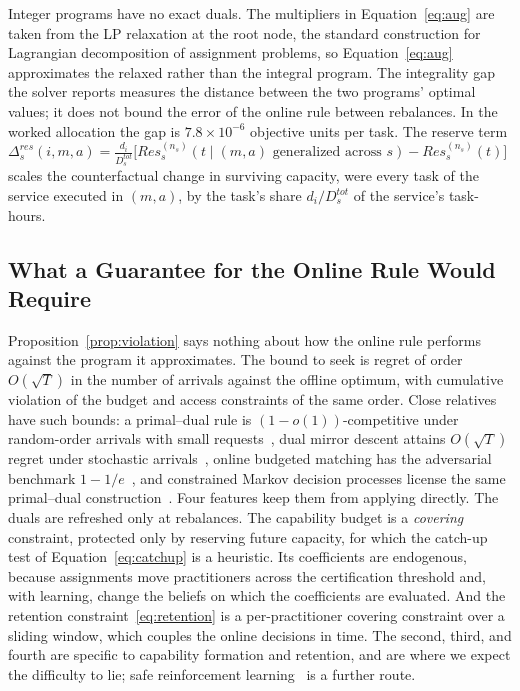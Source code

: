 \documentclass[utf8]{frontiers_suppmat}
\begin{document}
Integer programs have no exact duals. The multipliers in Equation~\eqref{eq:aug} are taken from the LP relaxation at the root node, the standard construction for Lagrangian decomposition of assignment problems, so Equation~\eqref{eq:aug} approximates the relaxed rather than the integral program. The integrality gap the solver reports measures the distance between the two programs' optimal values; it does not bound the error of the online rule between rebalances. In the worked allocation the gap is $7.8\times10^{-6}$ objective units per task. The reserve term $\Delta^{res}_s(i,m,a)=\frac{d_i}{D^{tot}_s}\bigl[Res^{(n_s)}_s(t\mid(m,a)\text{ generalized across }s)-Res^{(n_s)}_s(t)\bigr]$ scales the counterfactual change in surviving capacity, were every task of the service executed in $(m,a)$, by the task's share $d_i/D^{tot}_s$ of the service's task-hours.

\subsection{What a Guarantee for the Online Rule Would Require}
\label{app:onlinebound}

Proposition~\ref{prop:violation} says nothing about how the online rule performs against the program it approximates. The bound to seek is regret of order $O(\sqrt{T})$ in the number of arrivals against the offline optimum, with cumulative violation of the budget and access constraints of the same order. Close relatives have such bounds: a primal--dual rule is $(1-o(1))$-competitive under random-order arrivals with small requests~\citep{DevanurHayes2009}, dual mirror descent attains $O(\sqrt{T})$ regret under stochastic arrivals~\citep{Balseiro2023}, online budgeted matching has the adversarial benchmark $1-1/e$~\citep{Mehta2007}, and constrained Markov decision processes license the same primal--dual construction~\citep{Altman1999,Paternain2019}. Four features keep them from applying directly. The duals are refreshed only at rebalances. The capability budget is a \textit{covering} constraint, protected only by reserving future capacity, for which the catch-up test of Equation~\eqref{eq:catchup} is a heuristic. Its coefficients are endogenous, because assignments move practitioners across the certification threshold and, with learning, change the beliefs on which the coefficients are evaluated. And the retention constraint~\eqref{eq:retention} is a per-practitioner covering constraint over a sliding window, which couples the online decisions in time. The second, third, and fourth are specific to capability formation and retention, and are where we expect the difficulty to lie; safe reinforcement learning~\citep{GarciaFernandez2015} is a further route.
\end{document}
